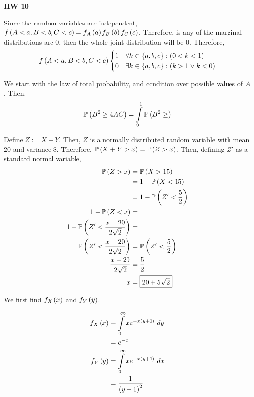 \documentclass{article}
\begin{document}
\begin{center}
  \Large \textbf{HW 10}
\end{center}

\setcounter{problem}{25}
\problem{}
\subproblema{}
Since the random variables are independent,
$f \left (A < a, B < b, C < c \right) = f_A \left (a \right) f_B \left (b \right) f_C \left (c \right)$.
Therefore, is any of the marginal distributions are $0$,
then the whole joint distribution will be $0$.
Therefore,
$$
f \left (A < a, B < b, C < c \right)
\begin{cases}
  1 & \forall k \in \left \{ a, b, c \right \} : \left (0 < k < 1 \right) \\
  0 & \exists k \in \left \{ a, b, c \right \} : \left ( k > 1 \lor k < 0 \right) \\
\end{cases}
$$

\subproblema{}

We start with the law of total probability, and condition over possible values of $A$.
Then,
\begin{align*}
  \mathbb{P} \left ( B^2 \geq 4 AC \right) =  \int \limits_{0}^{1} \mathbb{P} \left ( B^2 \geq  \right)
\end{align*}



\setcounter{problem}{33}
\problem{}

Define $Z := X + Y$.
Then,
$Z$ is a normally distributed random variable with mean $20$ and variance $8$.
Therefore,
$\mathbb{P} \left ( X + Y > x \right) = \mathbb{P} \left ( Z > x \right)$.
Then,
defining $Z'$ as a standard normal variable,
\begin{align*}
  \mathbb{P} \left ( Z > x \right) &= \mathbb{P} \left ( X > 15 \right) \\
             &= 1 - \mathbb{P} \left ( X < 15 \right) \\
             &= 1 - \mathbb{P} \left ( Z' < \frac{5}{2} \right) \\
  1 - \mathbb{P} \left ( Z < x \right) &= \\
  1 - \mathbb{P} \left ( Z' < \frac{x - 20}{2 \sqrt{2}} \right) &= \\
  \mathbb{P} \left ( Z' < \frac{x - 20}{2 \sqrt{2}} \right) &= \mathbb{P} \left ( Z' < \frac{5}{2} \right) \\
  \frac{x - 20}{2 \sqrt{2}} &= \frac{5}{2} \\
  x &= \boxed{20 + 5 \sqrt{2}} \\
\end{align*}

\setcounter{problem}{44}
\problem{}
\subproblema{}

We first find $f_X \left (x \right)$ and $f_Y \left (y \right)$.

\begin{align*}
  f_X \left (x \right) &= \int \limits_{0}^{\infty} x e^{-x \left (y+1 \right)}\ dy \\
               &= e^{-x} \\
  f_Y \left (y \right) &= \int \limits_{0}^{\infty} x e^{-x \left (y+1 \right)}\ dx \\
               &= \frac{1}{\left (y+1 \right)^2} \\
\end{align*}
\end{document}
